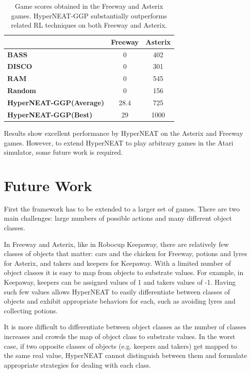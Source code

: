 \documentclass{acm_proc_article-sp}
\begin{document}
\begin{table}
\begin{center}
\begin{tabular}{|l|c|c|}
\hline
~ & \textbf{Freeway} & \textbf{Asterix} \\ \hline
\textbf{BASS} & 0 & 402 \\ \hline
\textbf{DISCO} & 0 & 301 \\ \hline
\textbf{RAM} & 0 & 545 \\ \hline
\textbf{Random} & 0 & 156 \\ \hline
\textbf{HyperNEAT-GGP(Average)} & 28.4 & 725 \\ \hline
\textbf{HyperNEAT-GGP(Best)} & 29 & 1000 \\ 
\hline
\end{tabular}
\end{center}
\label{tab:results-table}
\caption{Game scores obtained in the Freeway and Asterix games. HyperNEAT-GGP substantially outperforms related RL techniques on both Freeway and Asterix.}
\end{table}

Results show excellent performance by HyperNEAT on the Asterix and Freeway games. However, to extend HyperNEAT to play arbitrary games in the Atari simulator, some future work is required.

\section{Future Work}
\label{sec:futurework}
First the framework has to be extended to a larger set of games. There are two main challenges: large numbers of possible actions and many different object classes.

In Freeway and Asterix, like in Robocup Keepaway, there are relatively few classes of objects that matter: cars and the chicken for Freeway, potions and lyres for Asterix, and takers and keepers for Keepaway. With a limited number of object classes it is easy to map from objects to substrate values. For example, in Keepaway, keepers can be assigned values of 1 and takers values of -1. Having such few values allows HyperNEAT to easily differentiate between classes of objects and exhibit appropriate behaviors for each, such as avoiding lyres and collecting potions.

It is more difficult to differentiate between object classes as the number of classes increases and crowds the map of object class to substrate values. In the worst case, if two opposite classes of objects (e.g. keepers and takers) get mapped to the same real value, HyperNEAT cannot distinguish between them and formulate appropriate strategies for dealing with each class.
\end{document}

